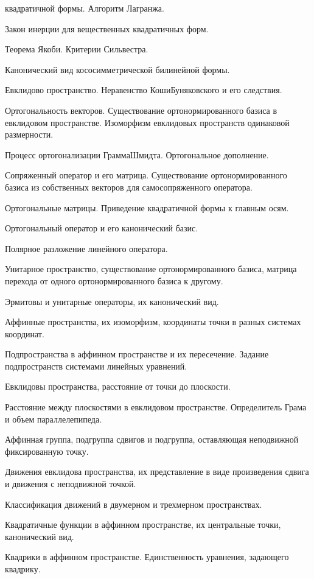 \documentclass[a4paper]{article}
\begin{document}
\begin{nums}{-2}
квадратичной формы. Алгоритм Лагранжа.
\item Закон инерции для вещественных квадратичных форм.
\item Теорема Якоби. Критерии Сильвестра.
\item Канонический вид кососимметрической билинейной формы.
\item Евклидово пространство. Неравенство Коши\ч Буняковского и его следствия.
\item Ортогональность векторов. Существование ортонормированного базиса в
евклидовом пространстве. Изоморфизм евклидовых пространств одинаковой
размерности.
\item Процесс ортогонализации Грамма\ч Шмидта. Ортогональное дополнение.
\item Сопряженный оператор и его матрица. Существование ортонормированного
базиса из собственных векторов для самосопряженного оператора.
\item Ортогональные матрицы. Приведение квадратичной формы к главным осям.
\item Ортогональный оператор и его канонический базис.
\item Полярное разложение линейного оператора.
\item Унитарное пространство, существование ортонормированного базиса, матрица
перехода от одного ортонормированного базиса к другому.
\item Эрмитовы и унитарные операторы, их канонический вид.
\item Аффинные пространства, их изоморфизм, координаты точки в разных системах
координат.
\item Подпространства в аффинном пространстве и их пересечение. Задание
подпространств системами линейных уравнений.
\item Евклидовы пространства, расстояние от точки до плоскости.
\item Расстояние между плоскостями в евклидовом пространстве. Определитель
Грама и объем параллелепипеда.
\item Аффинная группа, подгруппа сдвигов и подгруппа, оставляющая неподвижной
фиксированную точку.
\item Движения евклидова пространства, их представление в виде произведения
сдвига и движения с неподвижной точкой.
\item Классификация движений в двумерном и трехмерном пространствах.
\item Квадратичные функции в аффинном пространстве, их центральные точки,
канонический вид.
\item Квадрики в аффинном пространстве. Единственность уравнения, задающего квадрику.

\end{nums}
\end{document}
